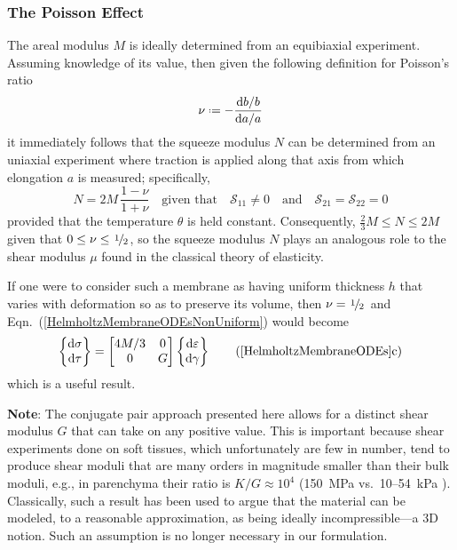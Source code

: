 \subsubsection{The Poisson Effect}
\label{PoissonRatio}

The areal modulus $M$ is ideally determined from an equibiaxial experiment.  Assuming knowledge of its value, then given the following definition for Poisson's ratio
\begin{displaymath}
\nu \defeq - \frac{\mathrm{d}b / b}{\mathrm{d}a / a}
\end{displaymath}
it immediately follows that the squeeze modulus $N$ can be determined from an uniaxial experiment where traction is applied along that axis from which elongation $a$ is measured; specifically,
\begin{displaymath}
N = 2M \, \frac{1 - \nu}{1 + \nu} 
\quad \text{given that} \quad
\mathcal{S}_{11} \neq 0 
\quad \text{and} \quad
\mathcal{S}_{21} = \mathcal{S}_{22} = 0 
\end{displaymath}
provided that the temperature $\theta$ is held constant.  Consequently, $\tfrac{2}{3} M \leq N \leq 2M$ given that $0 \leq \nu \leq \textfrac{1}{2}$, so the squeeze modulus $N$ plays an analogous role to the shear modulus $\mu$ found in the classical theory of elasticity.  

If one were to consider such a membrane as having uniform thickness $h$ that varies with deformation so as to preserve its volume, then $\nu = \textfrac{1}{2}$ and Eqn.~(\ref{HelmholtzMembraneODEsNonUniform}) would become
\begin{equation}
\left\{ \begin{matrix}
\mathrm{d} \sigma \\ \mathrm{d} \tau
\end{matrix} \right\} = \begin{bmatrix}
4 M / 3 & 0 \\
0 & G
\end{bmatrix} \left\{ \begin{matrix}
\mathrm{d} \varepsilon \\ \mathrm{d} \gamma
\end{matrix} \right\}
\label{HelmholtzMembraneODEsNonUniformCV}
    \tag{\ref{HelmholtzMembraneODEs}c}
\end{equation}
which is a useful result.

\medskip\noindent
\textbf{Note}: 
The conjugate pair approach presented here allows for a distinct shear modulus $G$ that can take on any positive value.  This is important because shear experiments done on soft tissues, which unfortunately are few in number, tend to produce shear moduli that are many orders in magnitude smaller than their bulk moduli, e.g., in parenchyma their ratio is $K/G \approx 10^{4}$ (150~MPa vs.\ 10--54~kPa \cite{Sarafetal07}).  Classically, such a result has been used to argue that the material can be modeled, to a reasonable approximation, as being ideally incompressible---a 3D notion.  Such an assumption is no longer necessary in our formulation.

